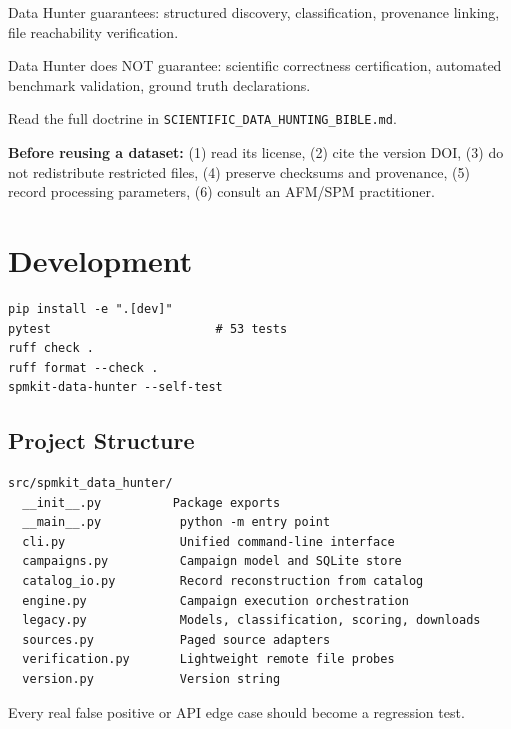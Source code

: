 \documentclass[11pt,a4paper]{article}
\begin{document}
Data Hunter guarantees: structured discovery, classification, provenance linking, file reachability verification.

Data Hunter does NOT guarantee: scientific correctness certification, automated benchmark validation, ground truth declarations.

Read the full doctrine in \texttt{SCIENTIFIC\_DATA\_HUNTING\_BIBLE.md}.

\bigskip
\begin{warnbox}
\textbf{Before reusing a dataset:} (1) read its license, (2) cite the version DOI, (3) do not redistribute restricted files, (4) preserve checksums and provenance, (5) record processing parameters, (6) consult an AFM/SPM practitioner.
\end{warnbox}

\section{Development}

\begin{lstlisting}
pip install -e ".[dev]"
pytest                       # 53 tests
ruff check .
ruff format --check .
spmkit-data-hunter --self-test
\end{lstlisting}

\subsection*{Project Structure}

\begin{lstlisting}
src/spmkit_data_hunter/
  __init__.py          Package exports
  __main__.py           python -m entry point
  cli.py                Unified command-line interface
  campaigns.py          Campaign model and SQLite store
  catalog_io.py         Record reconstruction from catalog
  engine.py             Campaign execution orchestration
  legacy.py             Models, classification, scoring, downloads
  sources.py            Paged source adapters
  verification.py       Lightweight remote file probes
  version.py            Version string
\end{lstlisting}

Every real false positive or API edge case should become a regression test.

\end{document}
